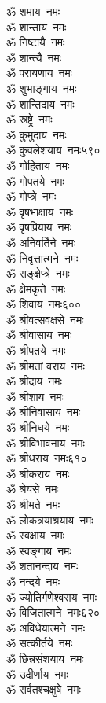 \begin{multicols}{2}
\begin{flushleft}
ॐ शमाय~नमः\\
ॐ शान्ताय~नमः\\
ॐ निष्टायै~नमः\\
ॐ शान्त्यै~नमः\\
ॐ परायणाय~नमः\\
ॐ शुभाङ्गाय~नमः\\
ॐ शान्तिदाय~नमः\\
ॐ स्रष्ट्रे~नमः\\
ॐ कुमुदाय~नमः\\
ॐ कुवलेशयाय~नमः\hfill ५९०\\
ॐ गोहिताय~नमः\\
ॐ गोपतये~नमः\\
ॐ गोप्त्रे~नमः\\
ॐ वृषभाक्षाय~नमः\\
ॐ वृषप्रियाय~नमः\\
ॐ अनिवर्तिने~नमः\\
ॐ निवृत्तात्मने~नमः\\
ॐ सङ्क्षेप्त्रे~नमः\\
ॐ क्षेमकृते~नमः\\
ॐ शिवाय~नमः\hfill ६००\\
ॐ श्रीवत्सवक्षसे~नमः\\
ॐ श्रीवासाय~नमः\\
ॐ श्रीपतये~नमः\\
ॐ श्रीमतां वराय~नमः\\
ॐ श्रीदाय~नमः\\
ॐ श्रीशाय~नमः\\
ॐ श्रीनिवासाय~नमः\\
ॐ श्रीनिधये~नमः\\
ॐ श्रीविभावनाय~नमः\\
ॐ श्रीधराय~नमः\hfill ६१०\\
ॐ श्रीकराय~नमः\\
ॐ श्रेयसे~नमः\\
ॐ श्रीमते~नमः\\
ॐ लोकत्रयाश्रयाय~नमः\\
ॐ स्वक्षाय~नमः\\
ॐ स्वङ्गाय~नमः\\
ॐ शतानन्दाय~नमः\\
ॐ नन्दये~नमः\\
ॐ ज्योतिर्गणेश्वराय~नमः\\
ॐ विजितात्मने~नमः\hfill ६२०\\
ॐ अविधेयात्मने~नमः\\
ॐ सत्कीर्तये~नमः\\
ॐ छिन्नसंशयाय~नमः\\
ॐ उदीर्णाय~नमः\\
ॐ सर्वतश्चक्षुषे~नमः\\

\end{flushleft}
\end{multicols}
